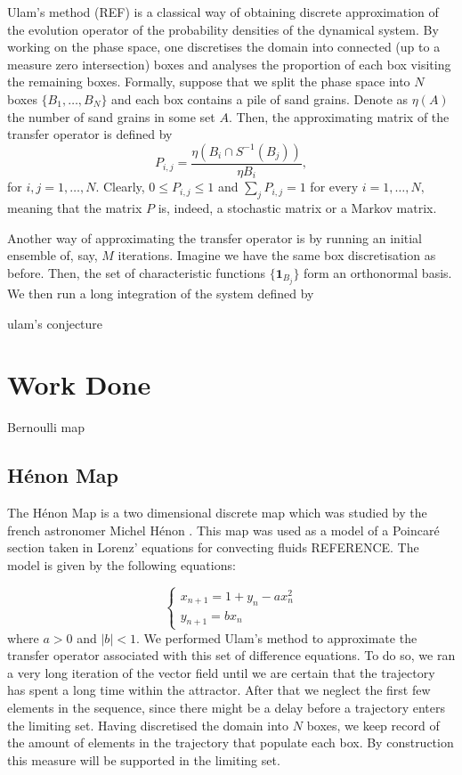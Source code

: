 Ulam's method (REF) is a classical way of obtaining discrete approximation of the evolution operator of the probability densities of the dynamical system. By working on the phase space, one discretises the domain into connected (up to a measure zero intersection) boxes and analyses the proportion of each box visiting the remaining boxes. Formally, suppose that we split the phase space into $N$ boxes $\{B_1,\ldots,B_N\}$ and each box contains a pile of sand grains. Denote as $\eta (A)$ the number of sand grains in some set $A$. Then, the approximating matrix of the transfer operator is defined by
\begin{equation}
	P_{i,j}=\frac{\eta(B_i \cap S^{-1}(B_j))}{\eta B_i},
\end{equation}
for $i,j=1,\ldots , N$. Clearly, $0\leq P_{i,j}\leq 1$ and $\sum _j P_{i,j}=1$ for every $i=1,\ldots , N,$ meaning that the matrix $P$ is, indeed, a stochastic matrix or a Markov matrix.

Another way of approximating the transfer operator is by running an initial ensemble of, say, $M$ iterations. Imagine we have the same box discretisation as before. Then, the set of characteristic functions $\{\mathbf{1}_{B_j}\}$ form an orthonormal basis. We then run a long integration of the system defined by


ulam's conjecture






\section*{Work  Done}

Bernoulli map

\subsection*{H\'{e}non Map}

The H\'{e}non Map is a two dimensional discrete map which was studied by the french astronomer Michel H\'{e}non \cite{henon}. This map was used as a model of a Poincar\'{e} section taken in Lorenz' equations for convecting fluids REFERENCE. The model is given by the following equations:

\begin{equation}
\begin{cases}
x_{n+1}=1+y_n - ax_n ^2 \\
y_{n+1}=bx_n
\end{cases}
\end{equation}
where $a>0$ and $\vert b \vert <1 $. We performed Ulam's method to approximate the transfer operator associated with this set of difference equations. To do so, we ran a very long iteration of the vector field until we are certain that the trajectory has spent a long time within the attractor. After that we neglect the first few elements in the sequence, since there might be a delay before a trajectory enters the limiting set. Having discretised the domain into $N$ boxes, we keep record of the amount of elements in the trajectory that populate each box. By construction this measure will be supported in the limiting set.

